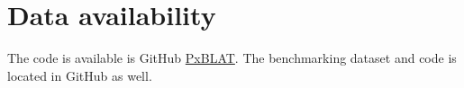 \section*{Data availability}\label{sec:data-availability}


The code is available is GitHub \href{https://github.com/cauliyang/pxblat}{PxBLAT}.
The benchmarking dataset and code is located in  GitHub as well.











































